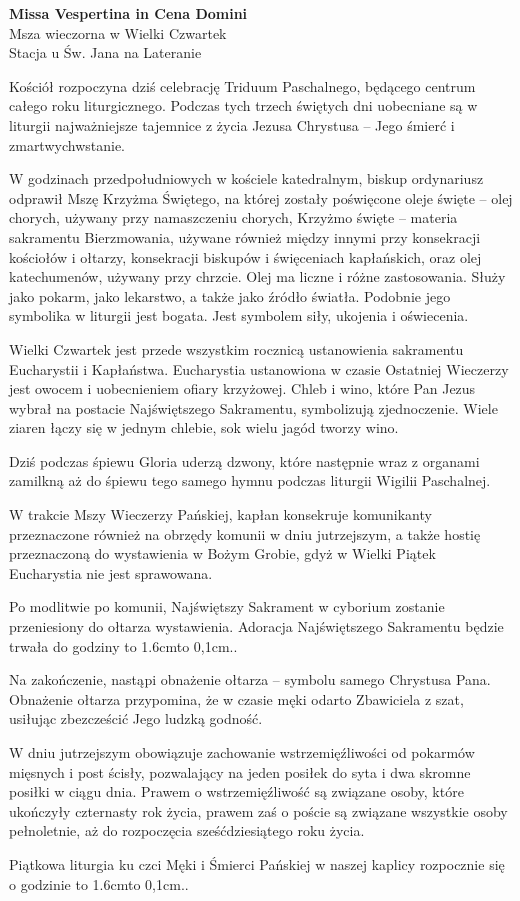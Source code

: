 \documentclass[10pt,oneside,final,notitlepage,a4paper,wide]{mwart}
\def\dotfill#1{\cleaders\hbox to #1{.}\hfill}
\newcommand\dotline[2][0,1cm]{\leavevmode\hbox to #2{\dotfill{#1}\hfil}}
\begin{document}
%
\begin{center}
	\LARGE{\textbf{Missa Vespertina in Cena Domini}}\\ \smallskip
	\small{Msza wieczorna w Wielki Czwartek\\ \smallskip Stacja u Św. Jana na Lateranie}
\end{center} \vspace{1cm}

	Kościół rozpoczyna dziś celebrację Triduum Paschalnego, będącego centrum całego roku liturgicznego. Podczas tych trzech świętych dni uobecniane są w liturgii najważniejsze tajemnice z życia Jezusa Chrystusa -- Jego śmierć i zmartwychwstanie.

W godzinach przedpołudniowych w kościele katedralnym, biskup ordynariusz odprawił Mszę Krzyżma Świętego, na której zostały poświęcone oleje święte -- olej chorych, używany przy namaszczeniu chorych, Krzyżmo święte -- materia sakramentu Bierzmowania, używane również między innymi przy konsekracji kościołów i ołtarzy, konsekracji biskupów i święceniach kapłańskich, oraz olej katechumenów, używany przy chrzcie. Olej ma liczne i różne zastosowania. Służy jako pokarm, jako lekarstwo, a także jako źródło światła. Podobnie jego symbolika w liturgii jest bogata. Jest symbolem siły, ukojenia i oświecenia.

Wielki Czwartek jest przede wszystkim rocznicą ustanowienia sakramentu Eucharystii i Kapłaństwa. Eucharystia ustanowiona w czasie Ostatniej Wieczerzy jest owocem i uobecnieniem ofiary krzyżowej. Chleb i wino, które Pan Jezus wybrał na postacie Najświętszego Sakramentu, symbolizują zjednoczenie. Wiele ziaren łączy się w jednym chlebie, sok wielu jagód tworzy wino.

Dziś podczas śpiewu Gloria uderzą dzwony, które następnie wraz z organami zamilkną aż do śpiewu tego samego hymnu podczas liturgii Wigilii Paschalnej.

W trakcie Mszy Wieczerzy Pańskiej, kapłan konsekruje komunikanty przeznaczone również na obrzędy komunii w dniu jutrzejszym, a także hostię przeznaczoną do wystawienia w Bożym Grobie, gdyż w Wielki Piątek Eucharystia nie jest sprawowana.

Po modlitwie po komunii, Najświętszy Sakrament w cyborium zostanie przeniesiony do ołtarza wystawienia. Adoracja Najświętszego Sakramentu będzie trwała do godziny \dotline{1.6cm}.

Na zakończenie, nastąpi obnażenie ołtarza -- symbolu samego Chrystusa Pana. Obnażenie ołtarza przypomina, że w czasie męki odarto Zbawiciela z szat, usiłując zbezcześcić Jego ludzką godność.

W dniu jutrzejszym obowiązuje zachowanie wstrzemięźliwości od pokarmów mięsnych i post ścisły, pozwalający na jeden posiłek do syta i dwa skromne posiłki w ciągu dnia. Prawem o wstrzemięźliwość są związane osoby, które ukończyły czternasty rok życia, prawem zaś o poście są związane wszystkie osoby pełnoletnie, aż do rozpoczęcia sześćdziesiątego roku życia.

Piątkowa liturgia ku czci Męki i Śmierci Pańskiej w naszej kaplicy rozpocznie się o godzinie \dotline{1.6cm}.
\end{document}
